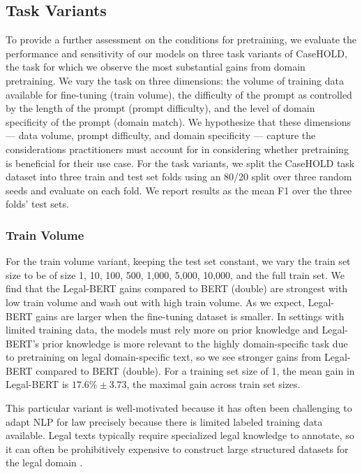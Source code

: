 \documentclass[sigconf]{acmart}
\begin{document}
\subsection{Task Variants}
To provide a further assessment on the conditions for pretraining, we evaluate the performance and sensitivity of our models on three task variants of CaseHOLD, the task for which we observe the most substantial gains from domain pretraining. We vary the task on three dimensions: the volume of training data available for fine-tuning (train volume), the difficulty of the prompt as controlled by the length of the prompt (prompt difficulty), and the level of domain specificity of the prompt (domain match). We hypothesize that these dimensions --- data volume, prompt difficulty, and domain specificity --- capture the considerations practitioners must account for in considering whether pretraining is beneficial for their use case. For the task variants, we split the CaseHOLD task dataset into three train and test set folds using an 80/20 split over three random seeds and evaluate on each fold. We report results as the mean F1 over the three folds' test sets.

\subsubsection{Train Volume}
For the train volume variant, keeping the test set constant, we vary the train set size to be of size 1, 10, 100, 500, 1,000, 5,000, 10,000, and the full train set. We find that the Legal-BERT gains compared to BERT (double) are strongest with low train volume and wash out with high train volume. As we expect, Legal-BERT gains are larger when the fine-tuning dataset is smaller. In settings with limited training data, the models must rely more on prior knowledge and Legal-BERT's prior knowledge is more relevant to the highly domain-specific task due to pretraining on legal domain-specific text, so we see stronger gains from Legal-BERT compared to BERT (double). For a training set size of 1, the mean gain in Legal-BERT is $17.6\% \pm 3.73$, the maximal gain across train set sizes.

This particular variant is well-motivated because it has often been challenging to adapt NLP for law precisely because there is limited labeled training data available. Legal texts typically require specialized legal knowledge to annotate, so it can often be prohibitively expensive to construct large structured datasets for the legal domain \cite{engstrom}.
\end{document}
